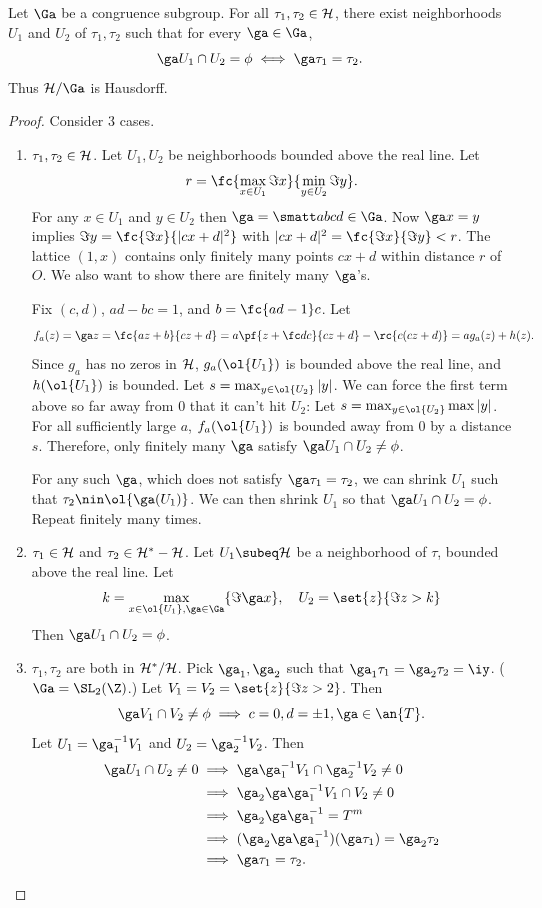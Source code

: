 \begin{lem}
Let $\Ga$ be a congruence subgroup. For all $\tau_1,\tau_2\in \cal H$, there exist neighborhoods $U_1$ and $U_2$ of $\tau_1,\tau_2$ such that for every $\ga\in \Ga$, 
\[
\ga U_1\cap U_2=\phi\iff \ga\tau_1=\tau_2.
\]
Thus $\cal H/\Ga$ is Hausdorff.
\end{lem}
\begin{proof}
Consider 3 cases.
\begin{enumerate}
\item
$\tau_1,\tau_2\in \cal H$. Let $U_1,U_2$ be neighborhoods bounded above the real line. Let
\[
r=\fc{\max_{x\in U_1}\Im x}{\min_{y\in U_2}\Im y}.
\]
For any $x\in U_1$ and $y\in U_2$ then $\ga=\smatt abcd\in \Ga$. Now $\ga x=y$ implies $\Im y=\fc{\Im x}{|cx+d|^2}$ with $|cx+d|^2=\fc{\Im x}{\Im y}<r$. The lattice $(1,x)$ contains only finitely many points $cx+d$ within distance $r$ of $O$. We also want to show there are finitely many $\ga$'s.

Fix $(c,d)$, $ad-bc=1$, and $b=\fc{ad-1}c$. Let 
\[f_a(z)=\ga z= \fc{az+b}{cz+d}=a\pf{z+\fc dc}{cz+d}-\rc{c(cz+d)}=ag_a(z)+h(z).\]
Since $g_a$ has no zeros in $\cal H$, $g_a(\ol{U_1})$ is bounded above the real line, and $h(\ol{U_1})$ is bounded. Let $s=\max_{y\in \ol{U_2}}|y|$. We can force the first term above so far away from 0 that it can't hit $U_2$: Let $s=\max_{y\in \ol{U_2}}\max|y|$. For all sufficiently large $a$, $f_a(\ol{U_1})$ is bounded away from 0 by a distance $s$. Therefore, only finitely many $\ga$ satisfy $\ga U_1\cap U_2\ne \phi$.

For any such $\ga$, which does not satisfy $\ga \tau_1=\tau_2$, we can shrink $U_1$ such that $\tau_2\nin \ol{\ga(U_1)}$. We can then shrink $U_1$ so that $\ga U_1\cap U_2=\phi$. Repeat finitely many times.
\item $\tau_1\in \cal H$ and $\tau_2\in \cal H^*-\cal H$.
Let $U_1\subeq \cal H$ be a neighborhood of $\tau$, bounded above the real line. Let
\[
k=\max_{x\in \ol{U_1},\ga\in \Ga} \{\Im\ga x\},
\quad
U_2=\set{z}{\Im z>k}\]
Then $\ga U_1\cap U_2=\phi$.
\item $\tau_1,\tau_2$ are both in $\cal H^*/\cal H$. Pick $\ga_1,\ga_2$ such that $\ga_1\tau_1=\ga_2\tau_2=\iy$. ($\Ga=\SL_2(\Z)$.) Let $V_1=V_2=\set{z}{\Im z>2}$. Then 
\[
\ga V_1\cap V_2\ne \phi\implies c=0,d=\pm 1,\ga\in \an{T}.
\]
Let $U_1=\ga_1^{-1}V_1$ and $U_2=\ga_2^{-1}V_2$. Then
\begin{align*}
\ga U_1\cap U_2\ne 0&\implies \ga\ga_1^{-1} V_1\cap \ga_2^{-1}V_2\ne 0\\
&\implies \ga_2\ga\ga_1^{-1} V_1\cap V_2\ne 0\\
&\implies \ga_2\ga\ga_1^{-1}=T^m\\
&\implies (\ga_2\ga\ga_1^{-1})(\ga \tau_1)=\ga_2\tau_2\\
&\implies \ga\tau_1=\tau_2.
\end{align*}
\end{enumerate}
\end{proof}
